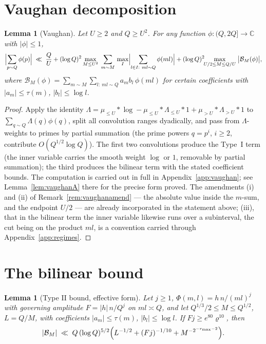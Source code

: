 \documentclass[11pt]{article}
\newtheorem{lemma}[theorem]{Lemma}
\theoremstyle{definition}
\theoremstyle{plain}
\begin{document}
\section{Vaughan decomposition}\label{sec:vaughan}

\begin{lemma}[Vaughan]\label{lem:vaughan}
Let $U\ge2$ and $Q\ge U^{2}$.  For any function
$\phi:(Q,2Q]\to\mathbb C$ with $|\phi|\le1$,
\[
\Bigl|\sum_{p\sim Q}\phi(p)\Bigr|
\;\ll\;\frac{Q}{U}+
(\log Q)^{2}\max_{M\le U^{2}}\;\sum_{m\sim M}\,
\max_{I}\Bigl|\sum_{l\in I:\ ml\sim Q}\phi(ml)\Bigr|
+(\log Q)^{2}\!\!\max_{\substack{U/2\le M\le Q/U}}\;
\bigl|\mathcal B_{M}(\phi)\bigr| ,
\]
where $\mathcal B_{M}(\phi)=\sum_{m\sim M}\sum_{l:\ ml\sim Q}
a_{m}b_{l}\,\phi(ml)$ for certain coefficients with
$|a_m|\le\tau(m)$, $|b_l|\le\log l$.
\end{lemma}

\begin{proof}
Apply the identity
$\Lambda=\mu_{\le U}*\log-\mu_{\le U}*\Lambda_{\le U}*1
+\mu_{>U}*\Lambda_{>U}*1$ to
$\sum_{q\sim Q}\Lambda(q)\phi(q)$, split all convolution ranges
dyadically, and pass from $\Lambda$-weights to primes by partial
summation (the prime powers $q=p^{i}$, $i\ge2$, contribute
$O(Q^{1/2}\log Q)$).  The first two convolutions produce the Type~I
term (the inner variable carries the smooth weight $\log$ or $1$,
removable by partial summation); the third produces the bilinear term
with the stated coefficient bounds.  The computation is carried out in
full in Appendix~\ref{app:vaughan}; see Lemma~\ref{lem:vaughanA} there
for the precise form proved.  The amendments (i) and (ii) of
Remark~\ref{rem:vaughanamend} --- the absolute value inside the $m$-sum,
and the endpoint $U/2$ --- are already incorporated in the statement
above; (iii), that in the bilinear term the inner variable likewise runs
over a subinterval, the cut being on the product $ml$, is a convention
carried through Appendix~\ref{app:regimes}.
\end{proof}

\section{The bilinear bound}\label{sec:typeII}

\begin{lemma}[Type II bound, effective form]\label{lem:typeII}
Let $j\ge1$, $\Phi(m,l)=h\,n/(ml)^{j}$ with governing amplitude
$F=|h|\,n/Q^{j}$ on $ml\asymp Q$, and let
$Q^{1/3}/2\le M\le Q^{1/2}$, $L=Q/M$, with coefficients
$|a_m|\le\tau(m)$, $|b_l|\le\log l$.  If $Fj\ge e^{80}\varrho^{10}$,
then
\[
|\mathcal B_{M}|\;\ll\;Q\,(\log Q)^{5/2}
\Bigl(L^{-1/2}+(Fj)^{-1/10}+M^{-2^{-r_{\max}-2}}\Bigr).
\]
\end{lemma}
\end{document}
